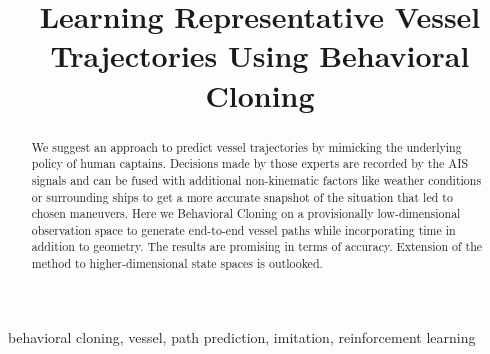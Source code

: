 \documentclass[conference]{IEEEtran}
\begin{document}
\title{Learning Representative Vessel Trajectories Using Behavioral Cloning\\}

\author{
}

\maketitle

\begin{abstract}
We suggest an approach to predict vessel trajectories by mimicking the underlying  policy of human captains. Decisions made by those experts are recorded by the AIS signals and can be fused with additional non-kinematic factors like weather conditions or surrounding ships to get a more accurate snapshot of the situation that led to chosen maneuvers. Here we Behavioral Cloning on a provisionally low-dimensional observation space to generate end-to-end vessel paths while incorporating time in addition to geometry. The results are promising in terms of accuracy. Extension of the method to higher-dimensional state spaces is outlooked.
\end{abstract}

\begin{IEEEkeywords}
behavioral cloning, vessel, path prediction, imitation, {reinforcement} learning
\end{IEEEkeywords}
\end{document}
